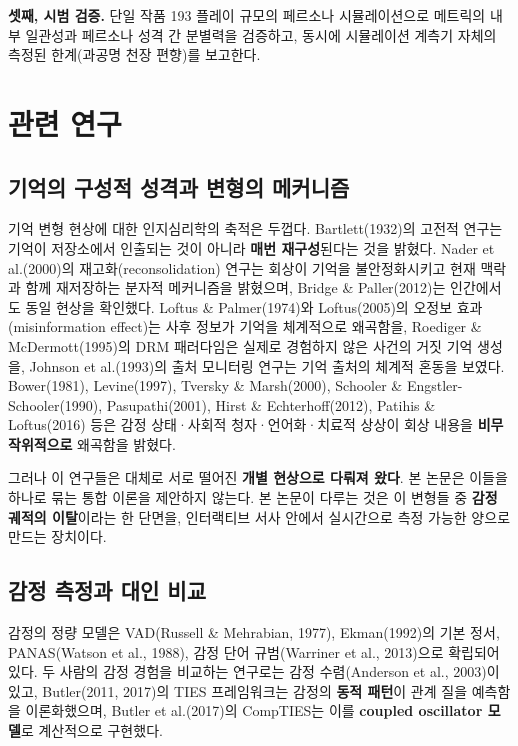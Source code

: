 \documentclass[11pt, a4paper]{article}
\begin{document}
\textbf{셋째, 시범 검증.} 단일 작품 193 플레이 규모의 페르소나 시뮬레이션으로 메트릭의 내부 일관성과 페르소나 성격 간 분별력을 검증하고, 동시에 시뮬레이션 계측기 자체의 측정된 한계(과공명 천장 편향)를 보고한다.

\section{관련 연구}

\subsection{기억의 구성적 성격과 변형의 메커니즘}

기억 변형 현상에 대한 인지심리학의 축적은 두껍다. Bartlett(1932)의 고전적 연구는 기억이 저장소에서 인출되는 것이 아니라 \textbf{매번 재구성}된다는 것을 밝혔다. Nader et al.(2000)의 재고화(reconsolidation) 연구는 회상이 기억을 불안정화시키고 현재 맥락과 함께 재저장하는 분자적 메커니즘을 밝혔으며, Bridge \& Paller(2012)는 인간에서도 동일 현상을 확인했다. Loftus \& Palmer(1974)와 Loftus(2005)의 오정보 효과(misinformation effect)는 사후 정보가 기억을 체계적으로 왜곡함을, Roediger \& McDermott(1995)의 DRM 패러다임은 실제로 경험하지 않은 사건의 거짓 기억 생성을, Johnson et al.(1993)의 출처 모니터링 연구는 기억 출처의 체계적 혼동을 보였다. Bower(1981), Levine(1997), Tversky \& Marsh(2000), Schooler \& Engstler-Schooler(1990), Pasupathi(2001), Hirst \& Echterhoff(2012), Patihis \& Loftus(2016) 등은 감정 상태·사회적 청자·언어화·치료적 상상이 회상 내용을 \textbf{비무작위적으로} 왜곡함을 밝혔다.

그러나 이 연구들은 대체로 서로 떨어진 \textbf{개별 현상으로 다뤄져 왔다}. 본 논문은 이들을 하나로 묶는 통합 이론을 제안하지 않는다. 본 논문이 다루는 것은 이 변형들 중 \textbf{감정 궤적의 이탈}이라는 한 단면을, 인터랙티브 서사 안에서 실시간으로 측정 가능한 양으로 만드는 장치이다.

\subsection{감정 측정과 대인 비교}

감정의 정량 모델은 VAD(Russell \& Mehrabian, 1977), Ekman(1992)의 기본 정서, PANAS(Watson et al., 1988), 감정 단어 규범(Warriner et al., 2013)으로 확립되어 있다. 두 사람의 감정 경험을 비교하는 연구로는 감정 수렴(Anderson et al., 2003)이 있고, Butler(2011, 2017)의 TIES 프레임워크는 감정의 \textbf{동적 패턴}이 관계 질을 예측함을 이론화했으며, Butler et al.(2017)의 CompTIES는 이를 \textbf{coupled oscillator 모델}로 계산적으로 구현했다.
\end{document}
